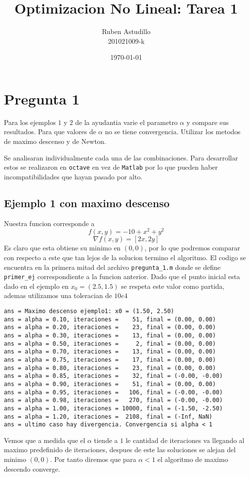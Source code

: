 \documentclass[letterpaper]{article}
\begin{document}
\title{Optimizacion No Lineal: Tarea 1}
\author{Ruben Astudillo \\ 201021009-k}
\date{\today}
\maketitle

\section*{Pregunta 1}
\noindent Para los ejemplos \(1\) y \(2\) de la ayudantia varie el
parametro \(\alpha\) y compare sus resultados. Para que valores de
\(\alpha\) no se tiene convergencia. Utilizar los metodos de maximo
descenso y de Newton.
\newline

Se analisaran individualmente cada una de las combinaciones. Para
desarrollar estos se realizaron en \texttt{octave} en vez de
\texttt{Matlab} por lo que pueden haber incompatibilidades que hayan
pasado por alto.󠀿

\subsection*{Ejemplo 1 con maximo descenso}
\noindent Nuestra funcion corresponde a
\[ f(x,y) = -10 + x^2 + y^2\]
\[ \nabla f (x,y) = [2 x , 2 y ] \]
Es claro que esta obtiene su minimo en \((0,0)\), por lo que podremos
comparar con respecto a este que tan lejos de la solucion termino el
algoritmo. El codigo se encuentra en la primera mitad del archivo
\texttt{pregunta\_1.m} donde se define \texttt{primer\_ej}
correspondiente a la funcion anterior. Dado que el punto inicial esta
dado en el ejemplo en \(x_0 = (2.5, 1.5)\) se respeta este valor como
partida, ademas utilizamos una toleracian de \(10e4\)
\begin{verbatim}
ans = Maximo descenso ejemplo1: x0 = (1.50, 2.50)
ans = alpha = 0.10, iteraciones =    51, final = (0.00, 0.00)
ans = alpha = 0.20, iteraciones =    23, final = (0.00, 0.00)
ans = alpha = 0.30, iteraciones =    13, final = (0.00, 0.00)
ans = alpha = 0.50, iteraciones =     2, final = (0.00, 0.00)
ans = alpha = 0.70, iteraciones =    13, final = (0.00, 0.00)
ans = alpha = 0.75, iteraciones =    17, final = (0.00, 0.00)
ans = alpha = 0.80, iteraciones =    23, final = (0.00, 0.00)
ans = alpha = 0.85, iteraciones =    32, final = (-0.00, -0.00)
ans = alpha = 0.90, iteraciones =    51, final = (0.00, 0.00)
ans = alpha = 0.95, iteraciones =   106, final = (-0.00, -0.00)
ans = alpha = 0.98, iteraciones =   270, final = (-0.00, -0.00)
ans = alpha = 1.00, iteraciones = 10000, final = (-1.50, -2.50)
ans = alpha = 1.20, iteraciones =  2108, final = (-Inf, NaN)
ans = ultimo caso hay divergencia. Convergencia si alpha < 1
\end{verbatim}
Vemos que a medida que el \(\alpha\) tiende a \(1\) le cantidad de
iteraciones va llegando al maximo predefinido de iteraciones, despues de
este las soluciones se alejan del minimo \((0,0)\). Por tanto diremos que
para \(\alpha < 1\) el algoritmo de maximo descendo converge.
\end{document}
